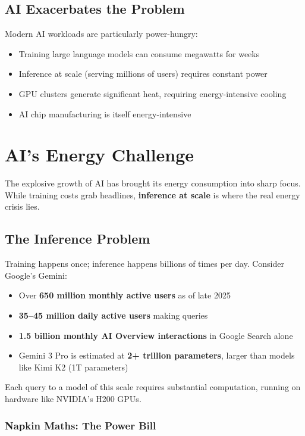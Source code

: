 \documentclass[11pt,a4paper]{article}
\begin{document}
\subsection{AI Exacerbates the Problem}

Modern AI workloads are particularly power-hungry:
\begin{itemize}
    \item Training large language models can consume megawatts for weeks
    \item Inference at scale (serving millions of users) requires constant power
    \item GPU clusters generate significant heat, requiring energy-intensive cooling
    \item AI chip manufacturing is itself energy-intensive
\end{itemize}

\section{AI's Energy Challenge}

The explosive growth of AI has brought its energy consumption into sharp focus. While training costs grab headlines, \textbf{inference at scale} is where the real energy crisis lies.

\subsection{The Inference Problem}

Training happens once; inference happens billions of times per day. Consider Google's Gemini:
\begin{itemize}
    \item Over \textbf{650 million monthly active users} as of late 2025
    \item \textbf{35--45 million daily active users} making queries
    \item \textbf{1.5 billion monthly AI Overview interactions} in Google Search alone
    \item Gemini 3 Pro is estimated at \textbf{2+ trillion parameters}, larger than models like Kimi K2 (1T parameters)
\end{itemize}

Each query to a model of this scale requires substantial computation, running on hardware like NVIDIA's H200 GPUs.

\subsubsection{Napkin Maths: The Power Bill}
\end{document}
